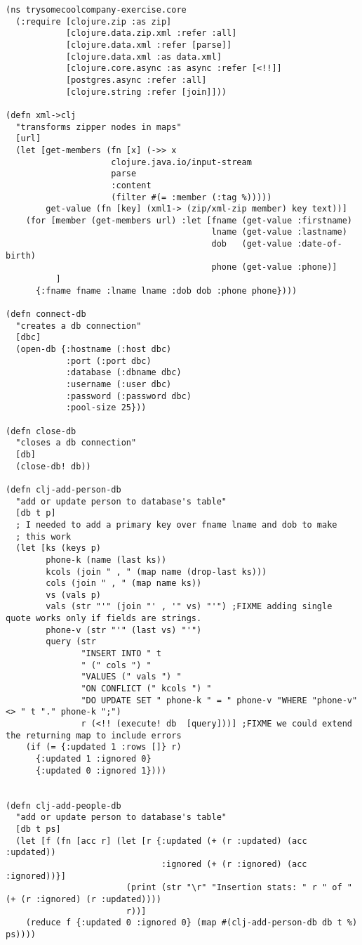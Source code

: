 \documentclass[11pt]{article}
\begin{document}
\begin{verbatim}
(ns trysomecoolcompany-exercise.core
  (:require [clojure.zip :as zip]
            [clojure.data.zip.xml :refer :all]
            [clojure.data.xml :refer [parse]]
            [clojure.data.xml :as data.xml]
            [clojure.core.async :as async :refer [<!!]]
            [postgres.async :refer :all]
            [clojure.string :refer [join]]))

(defn xml->clj
  "transforms zipper nodes in maps"
  [url]
  (let [get-members (fn [x] (->> x
                     clojure.java.io/input-stream
                     parse
                     :content
                     (filter #(= :member (:tag %)))))
        get-value (fn [key] (xml1-> (zip/xml-zip member) key text))]
    (for [member (get-members url) :let [fname (get-value :firstname)
                                         lname (get-value :lastname)
                                         dob   (get-value :date-of-birth)
                                         phone (get-value :phone)]
          ]
      {:fname fname :lname lname :dob dob :phone phone})))

(defn connect-db
  "creates a db connection"
  [dbc]
  (open-db {:hostname (:host dbc)
            :port (:port dbc)
            :database (:dbname dbc)
            :username (:user dbc)
            :password (:password dbc)
            :pool-size 25}))

(defn close-db
  "closes a db connection"
  [db]
  (close-db! db))

(defn clj-add-person-db
  "add or update person to database's table"
  [db t p]
  ; I needed to add a primary key over fname lname and dob to make
  ; this work
  (let [ks (keys p)
        phone-k (name (last ks))
        kcols (join " , " (map name (drop-last ks)))        
        cols (join " , " (map name ks))
        vs (vals p)
        vals (str "'" (join "' , '" vs) "'") ;FIXME adding single quote works only if fields are strings.
        phone-v (str "'" (last vs) "'")
        query (str
               "INSERT INTO " t
               " (" cols ") "
               "VALUES (" vals ") "
               "ON CONFLICT (" kcols ") "
               "DO UPDATE SET " phone-k " = " phone-v "WHERE "phone-v" <> " t "." phone-k ";")
               r (<!! (execute! db  [query]))] ;FIXME we could extend the returning map to include errors
    (if (= {:updated 1 :rows []} r)
      {:updated 1 :ignored 0}
      {:updated 0 :ignored 1})))


(defn clj-add-people-db
  "add or update person to database's table"
  [db t ps]
  (let [f (fn [acc r] (let [r {:updated (+ (r :updated) (acc :updated))
                               :ignored (+ (r :ignored) (acc :ignored))}]
                        (print (str "\r" "Insertion stats: " r " of " (+ (r :ignored) (r :updated))))
                        r))]
    (reduce f {:updated 0 :ignored 0} (map #(clj-add-person-db db t %) ps))))


\end{verbatim}
\end{document}
